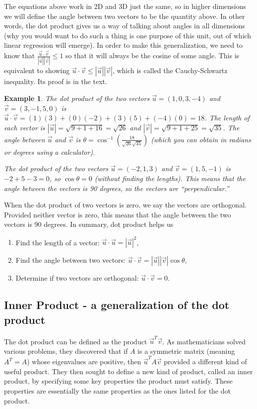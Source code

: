 \documentclass[10pt]{article}
\theoremstyle{plain}
\theoremstyle{box}
\newtheorem{example}{Example}
\begin{document}
The equations above work in 2D and 3D just the same, so in higher dimensions we will define the angle between two vectors to be the quantity above. In other words, the dot product gives us a way of talking about angles in all dimensions (why you would want to do such a thing is one purpose of this unit, out of which linear regression will emerge).  In order to make this generalization, we need to know that $\frac{\vec u\cdot\vec v}{|\vec u||\vec v|}\leq 1$ so that it will always be the cosine of some angle.  This is equivalent to showing $\vec u\cdot\vec v\leq |\vec u||\vec v|$, which is called the Cauchy-Schwartz inequality. Its proof is in the text.



\begin{example}
The dot product of the two vectors $\vec u = (1,0,3,-4)$ and $\vec v=(3,-1,5,0)$ is $\vec u\cdot \vec v = (1)(3)+(0)(-2)+(3)(5)+(-4)(0) = 18$. The length of each vector is $|\vec u| = \sqrt{9+1+16} = \sqrt{26}$ and $|\vec v| = \sqrt{9+1+25} = \sqrt{35}$.  The angle between $\vec u$ and $\vec v$ is $\theta  = \cos ^{-1} \left(\frac{18}{\sqrt{26}\sqrt{35}}\right)$ (which you can obtain in radians or degrees using a calculator).

The dot product of the two vectors $\vec u = (-2,1,3)$ and $\vec v = (1,5,-1)$ is $-2+5-3=0$, so $\cos \theta = 0$ (without finding the lengths). This means that the angle between the vectors is 90 degrees, so the vectors are ``perpendicular.''  
\end{example}

When the dot product of two vectors is zero, we say the vectors are orthogonal. Provided neither vector is zero, this means that the angle between the two vectors is 90 degrees.  In summary, dot product helps us
\begin{enumerate}
	\item Find the length of a vector: $\vec u \cdot \vec u=|\vec u |^2$,
	\item Find the angle between two vectors: $\vec u \cdot \vec v = |\vec u||\vec v|\cos \theta$,
	\item Determine if two vectors are orthogonal: $\vec u \cdot \vec v = 0$.
\end{enumerate}
 
\subsection{Inner Product - a generalization of the dot product}
The dot product can be defined as the product $\vec u^T\vec v$. As mathematicians solved various problems, they discovered that if $A$ is a symmetric matrix (meaning $A^T=A$) whose eigenvalues are positive, then $\vec u^T A \vec v$ provided a different kind of useful product. They then sought to define a new kind of product, called an inner product, by specifying some key properties the product must satisfy.  These properties are essentially the same properties as the ones listed for the dot product.   
\end{document}
